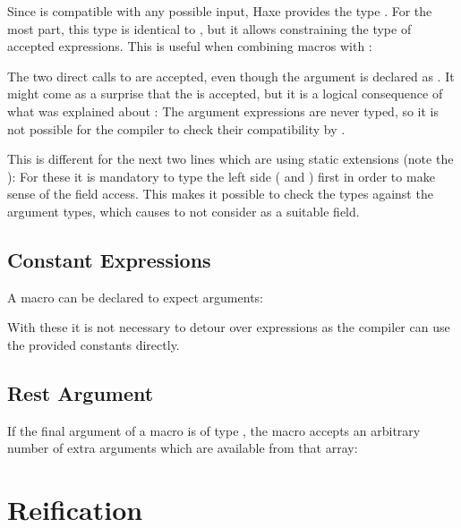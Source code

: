 \documentclass{haxe}
\begin{document}
Since  is compatible with any possible input, Haxe provides the type . For the most part, this type is identical to , but it allows constraining the type of accepted expressions. This is useful when combining macros with :


The two direct calls to  are accepted, even though the argument is declared as . It might come as a surprise that the   is accepted, but it is a logical consequence of what was explained about : The argument expressions are never typed, so it is not possible for the compiler to check their compatibility by .

This is different for the next two lines which are using static extensions (note the ): For these it is mandatory to type the left side ( and ) first in order to make sense of the  field access. This makes it possible to check the types against the argument types, which causes  to not consider  as a suitable field.

\subsection{Constant Expressions}
\label{macro-constant-arguments}

A macro can be declared to expect  arguments:


With these it is not necessary to detour over expressions as the compiler can use the provided constants directly.

\subsection{Rest Argument}
\label{macro-rest-argument}

If the final argument of a macro is of type , the macro accepts an arbitrary number of extra arguments which are available from that array:





\section{Reification}
\label{macro-reification}
\end{document}
